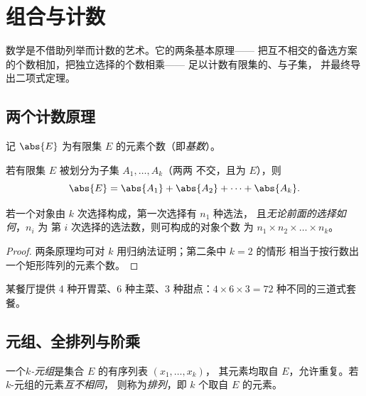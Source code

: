 \chapter{组合与计数}\label{ch:g12:comb}

数学是不借助列举而计数的艺术。它的两条基本原理——
把互不相交的备选方案的个数相加，把独立选择的个数相乘——
足以计数有限集的、与子集，
并最终导出二项式定理。

\section{两个计数原理}

记 $\abs{E}$ 为有限集
$E$ 的元素个数（即\emph{基数}）。

\begin{proposition}[加法原理]\label{prop:g12:comb:addition}
若有限集 $E$ 被划分为子集 $A_1, \dots, A_k$（两两
不交，且为 $E$），则
\[
\abs{E} = \abs{A_1} + \abs{A_2} + \dots + \abs{A_k}.
\]
\end{proposition}

\begin{proposition}[乘法原理]\label{prop:g12:comb:multiplication}
若一个对象由 $k$ 次选择构成，第一次选择有 $n_1$ 种选法，
且\emph{无论前面的选择如何}，$n_i$ 为
第 $i$ 次选择的选法数，则可构成的对象个数
为 $n_1 \times n_2 \times \dots \times n_k$。
\end{proposition}

\begin{proof}
两条原理均可对 $k$ 用归纳法证明；第二条中 $k = 2$ 的情形
相当于按行数出一个矩形阵列的元素个数。
\end{proof}

\begin{example}
某餐厅提供 4 种开胃菜、6 种主菜、3 种甜点：$4 \times 6 \times 3 =
72$ 种不同的三道式套餐。
\end{example}

\section{元组、全排列与阶乘}

\begin{definition}[$k$-元组]\label{def:g12:comb:tuples}
一个\emph{$k$-元组}是集合 $E$ 的有序列表 $(x_1, \dots, x_k)$，
其元素均取自 $E$，允许重复。若 $k$-元组的元素\emph{互不相同}，
则称为\emph{排列}，即 $k$ 个取自 $E$ 的元素。
\end{definition}

